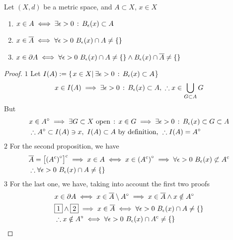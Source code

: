 \documentclass[../complete.tex]{subfiles}
\begin{document}
\begin{prop}
	Let $(X,d)$ be a metric space, and $A\subset X$, $x\in X$
	\begin{enumerate}
	\item $x\in A\iff\exists\epsilon>0\, :\,  B_\epsilon(x)\subset A$
	\item $x\in\cc{A}\iff\forall\epsilon>0\ B_\epsilon(x)\cap A\ne\{\}$
	\item $x\in\partial A\iff\forall\epsilon>0\ B_\epsilon(x)\cap A\ne\{\}\wedge B_\epsilon(x)\cap\overline{A}\ne\{\}$
	\end{enumerate}
\end{prop}
\begin{proof}
		$\boxed{1}$ Let $I(A):=\{\left.x\in X\right|_{}\exists\epsilon>0\, :\,  B_\epsilon(x)\subset A$\}\\
		\begin{equation*}
			x\in I(A)\implies{}\exists\epsilon>0\, :\,  B_\epsilon(x)\subset A,\ \therefore x\in\bigcup_{G\subset A}G
		\end{equation*}
		But
		\begin{equation*}
			\begin{aligned}
				&x\in A^{\circ}\implies{}\exists G\subset X\text{ open}\, :\,  x\in G\implies{}\exists\epsilon>0\, :\,  B_\epsilon(x)\subset G\subset A\\
				&\therefore A^{\circ}\subset I(A)\ni x,\ I(A)\subset A\text{ by definition, }\therefore I(A)=A^{\circ}
			\end{aligned}
		\end{equation*}
		$\boxed{2}$ For the second proposition, we have
		\begin{equation*}
			\begin{aligned}
				&\cc{A}=\comp{\left[ \intr{\left( \comp{A} \right)} \right]}\implies{} x\in A\iff x\in\intr{\left( \comp{A} \right)}\implies{}\forall\epsilon>0\ B_\epsilon(x)\not\subset\comp{A}\\
				&\therefore\forall\epsilon>0\ B_\epsilon(x)\cap A\ne\{\}
			\end{aligned}
		\end{equation*}
		$\boxed{3}$ For the last one, we have, taking into account the first two proofs
		\begin{equation*}
			\begin{aligned}
				&x\in\partial A\iff x\in\cc{A}\setminus\intr{A}\implies{} x\in\cc{A}\wedge x\notin\intr{A}\\
				&\boxed{1}\wedge\boxed{2}\implies{} x\in\cc{A}\iff\forall\epsilon>0\ B_\epsilon(x)\cap A\ne\{\}\\
				&\therefore x\notin\intr{A}\iff\forall\epsilon>0\ B_\epsilon(x)\cap\comp{A}\ne\{\}
			\end{aligned}
		\end{equation*}
\end{proof}
\end{document}
